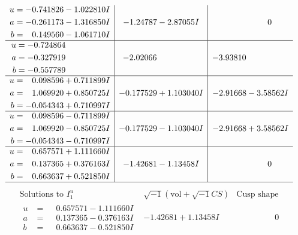 \documentclass[1p]{elsarticle_modified}
\theoremstyle{definition}
\newcommand{\I}{\sqrt{-1}}
\begin{document}
$$\begin{array}{c|c|c}
\begin{aligned}
u &= -0.741826 - 1.022810 I \\
a &= -0.261173 - 1.316850 I \\
b &= \phantom{-}0.149560 - 1.061710 I\end{aligned}
 & -1.24787 - 2.87055 I & \phantom{-0.000000 } 0 \\ \hline\begin{aligned}
u &= -0.724864\phantom{ +0.000000I} \\
a &= -0.327919\phantom{ +0.000000I} \\
b &= -0.557789\phantom{ +0.000000I}\end{aligned}
 & -2.02066\phantom{ +0.000000I} & -3.93810\phantom{ +0.000000I} \\ \hline\begin{aligned}
u &= \phantom{-}0.098596 + 0.711899 I \\
a &= \phantom{-}1.069920 + 0.850725 I \\
b &= -0.054343 + 0.710997 I\end{aligned}
 & -0.177529 + 1.103040 I & -2.91668 - 3.58562 I \\ \hline\begin{aligned}
u &= \phantom{-}0.098596 - 0.711899 I \\
a &= \phantom{-}1.069920 - 0.850725 I \\
b &= -0.054343 - 0.710997 I\end{aligned}
 & -0.177529 - 1.103040 I & -2.91668 + 3.58562 I \\ \hline\begin{aligned}
u &= \phantom{-}0.657571 + 1.111660 I \\
a &= \phantom{-}0.137365 + 0.376163 I \\
b &= \phantom{-}0.663637 + 0.521850 I\end{aligned}
 & -1.42681 - 1.13458 I & \phantom{-0.000000 } 0\\
 \hline 
 \end{array}$$\newpage$$\begin{array}{c|c|c}  
\text{Solutions to }I^u_{1}& \I (\text{vol} + \sqrt{-1}CS) & \text{Cusp shape}\\
 \hline 
\begin{aligned}
u &= \phantom{-}0.657571 - 1.111660 I \\
a &= \phantom{-}0.137365 - 0.376163 I \\
b &= \phantom{-}0.663637 - 0.521850 I\end{aligned}
 & -1.42681 + 1.13458 I & \phantom{-0.000000 } 0 \\ \hline\begin{aligned}

\end{aligned}
\end{array}$$
\end{document}
